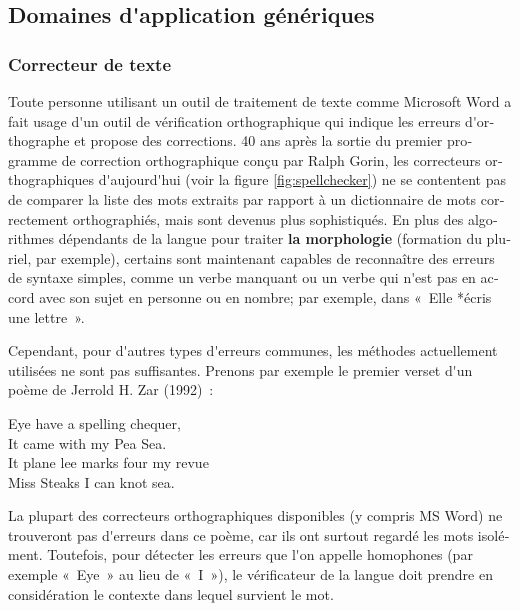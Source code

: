 \documentclass[]{../metanetpaper}
\begin{document}
\begin{french}
\begin{multicols}{2}
\subsection{Domaines d{\mbox '}application génériques}

\subsubsection{Correcteur de texte}
Toute personne utilisant un outil de traitement de texte comme
Microsoft Word a fait usage d{\mbox '}un outil de vérification orthographique
qui indique les erreurs d{\mbox '}orthographe et propose des corrections.  40
ans après la sortie du premier programme de correction orthographique
conçu par Ralph Gorin, les correcteurs orthographiques d{\mbox '}aujourd{\mbox '}hui
(voir la figure \ref{fig:spellchecker}) ne se contentent pas de
comparer la liste des mots extraits par rapport à un dictionnaire de
mots correctement orthographiés, mais sont devenus plus
sophistiqués. En plus des algorithmes dépendants de la langue pour
traiter {\bf la morphologie} (formation du pluriel, par exemple),
certains sont maintenant capables de reconnaître des erreurs de
syntaxe simples, comme un verbe manquant ou un verbe qui n{\mbox '}est pas en
accord avec son sujet en personne ou en nombre; par exemple, dans
«~Elle *écris une lettre~».

Cependant, pour d{\mbox '}autres types d{\mbox '}erreurs communes, les
méthodes actuellement utilisées ne sont pas suffisantes. Prenons par
exemple le premier verset d{\mbox '}un poème de Jerrold H. Zar
(1992)~:\\
\begin{it}
\begin{center}
Eye have a spelling chequer,\\
It came with my Pea Sea.\\
It plane lee marks four my revue\\
Miss Steaks I can knot sea.\\
\end{center}
\end{it}
La plupart des correcteurs orthographiques disponibles (y compris MS
Word) ne trouveront pas d{\mbox '}erreurs dans ce poème, car ils ont surtout
regardé les mots isolément. Toutefois, pour détecter les erreurs que
l{\mbox '}on appelle homophones (par exemple «~Eye~» au lieu de «~I~»), le
vérificateur de la langue doit prendre en considération le contexte
dans lequel survient le mot.


\end{multicols}
\end{french}
\end{document}
